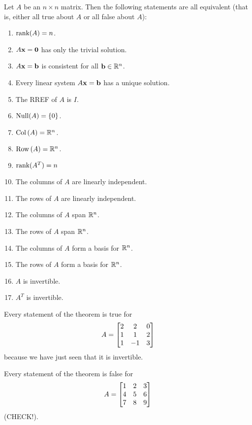 \begin{theorem}
Let $A$ be an $n \times n$ matrix.  Then the following statements
are all equivalent (that is, either all true about $A$ or all
false about $A$):
\begin{enumerate}[(1)]
\item $\textrm{rank}(A) = n$.
\item $A\mathbf{x}=\mathbf{0}$ has only the trivial solution.
\item $A\mathbf{x} = \mathbf{b}$ is consistent for all $\mathbf{b} \in \mathbb{R}^n$.
\item Every linear system $A\mathbf{x}=\mathbf{b}$ has a unique solution.
\item The RREF of $A$ is $I$.
\item $\operatorname{Null}(A) = \{0\}$.
\item $\operatorname{Col\,}(A) = \mathbb{R}^n$.
\item $\operatorname{Row\,}(A) = \mathbb{R}^n$.
\item $\textrm{rank}(A^T) = n$
\item The columns of $A$ are linearly independent.
\item The rows of $A$ are linearly independent.
\item The columns of $A$ span $\mathbb{R}^n$.
\item The rows of $A$ span $\mathbb{R}^n$.
\item The columns of $A$ form a basis for $\mathbb{R}^n$.
\item The rows of $A$ form a basis for $\mathbb{R}^n$.
\item $A$ is invertible.
\item $A^T$ is invertible.
\end{enumerate}
\end{theorem}

\begin{myexample} Every statement of the theorem is true for
$$
A = \left[ \begin{matrix} 2 & 2 & 0 \\ 1 & 1 & 2\\ 1 & -1 & 3 \end{matrix} \right]
$$
because we have just seen that it is invertible.
\end{myexample}

\begin{myexample} Every statement of the theorem is false for
$$
A = \left[ \begin{matrix} 1 & 2 & 3\\ 4 & 5 & 6\\ 7 & 8 & 9 \end{matrix} \right]
$$
(CHECK!).
\end{myexample}

